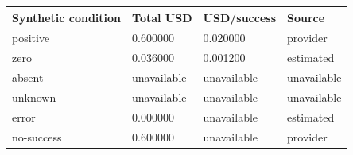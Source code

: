 \begin{tabular}{llll}\toprule
Synthetic condition & Total USD & USD/success & Source \\\midrule
positive & 0.600000 & 0.020000 & provider \\
zero & 0.036000 & 0.001200 & estimated \\
absent & unavailable & unavailable & unavailable \\
unknown & unavailable & unavailable & unavailable \\
error & 0.000000 & unavailable & estimated \\
no-success & 0.600000 & unavailable & provider \\
\bottomrule\end{tabular}
